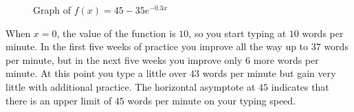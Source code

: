 \documentclass[10pt,]{book}
\theoremstyle{ptxdefinitionnotitle}
\theoremstyle{ptxdefinitiontitle}
\theoremstyle{ptxdefinitionnotitle}
\theoremstyle{ptxdefinitiontitle}
\theoremstyle{ptxdefinitionnotitle}
\theoremstyle{ptxdefinitiontitle}
\numberwithin{equation}{section}
\begin{document}
\begin{example}
\begin{figure}
{
}
\caption{Graph of \(f(x) = 45 - 35e^{-0.3x}\)\label{figure-exp-comp-pt3}}
\end{figure}
\hypertarget{p-249}{}%
When \(x=0\), the value of the function is \(10\), so you start typing at \(10\) words per minute.  In the first five weeks of practice you improve all the way up to \(37\) words per minute, but in the next five weeks you improve only \(6\) more words per minute.  At this point you type a little over \(43\) words per minute but gain very little with additional practice.  The horizontal asymptote at \(45\) indicates that there is an upper limit of \(45\) words per minute on your typing speed.%
\end{example}
\end{document}
